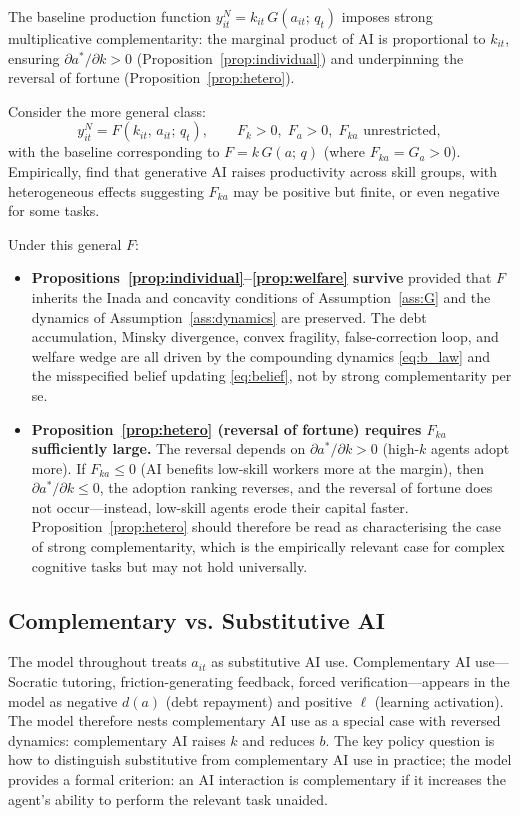 \documentclass[12pt]{article}
\begin{document}
The baseline production function $y^N_{it} = k_{it}\,G(a_{it};\,q_t)$ imposes
strong multiplicative complementarity: the marginal product of AI is proportional
to $k_{it}$, ensuring $\partial a^*/\partial k > 0$ (Proposition~\ref{prop:individual})
and underpinning the reversal of fortune (Proposition~\ref{prop:hetero}).

Consider the more general class:
\[
y^N_{it} = F(k_{it},\, a_{it};\, q_t), \qquad F_k > 0,\; F_a > 0,\; F_{ka} \text{ unrestricted},
\]
with the baseline corresponding to $F = k\,G(a;\,q)$ (where $F_{ka} = G_a > 0$).
Empirically, \citet{BrynjolfssonEtAl2025} find that generative AI raises
productivity across skill groups, with heterogeneous effects suggesting
$F_{ka}$ may be positive but finite, or even negative for some tasks.

Under this general $F$:
\begin{itemize}
\item \textbf{Propositions~\ref{prop:individual}--\ref{prop:welfare} survive}
provided that $F$ inherits the Inada and concavity conditions of Assumption~\ref{ass:G}
and the dynamics of Assumption~\ref{ass:dynamics} are preserved. The debt
accumulation, Minsky divergence, convex fragility, false-correction loop, and
welfare wedge are all driven by the compounding dynamics \eqref{eq:b_law} and the
misspecified belief updating \eqref{eq:belief}, not by strong complementarity per se.
\item \textbf{Proposition~\ref{prop:hetero} (reversal of fortune) requires
$F_{ka}$ sufficiently large.} The reversal depends on $\partial a^*/\partial k > 0$
(high-$k$ agents adopt more). If $F_{ka} \leq 0$ (AI benefits low-skill workers
more at the margin), then $\partial a^*/\partial k \leq 0$, the adoption ranking
reverses, and the reversal of fortune does not occur---instead, low-skill agents
erode their capital faster. Proposition~\ref{prop:hetero} should therefore be
read as characterising the case of strong complementarity, which is the empirically
relevant case for complex cognitive tasks \citep{DellAcquaEtAl2023} but may not
hold universally.
\end{itemize}

\subsection{Complementary vs. Substitutive AI}

The model throughout treats $a_{it}$ as substitutive AI use. Complementary AI
use---Socratic tutoring, friction-generating feedback, forced verification---appears
in the model as negative $d(a)$ (debt repayment) and positive $\ell$ (learning
activation). The model therefore nests complementary AI use as a special case with
reversed dynamics: complementary AI raises $k$ and reduces $b$. The key policy
question is how to distinguish substitutive from complementary AI use in practice;
the model provides a formal criterion: an AI interaction is complementary if it
increases the agent's ability to perform the relevant task unaided.
\end{document}
